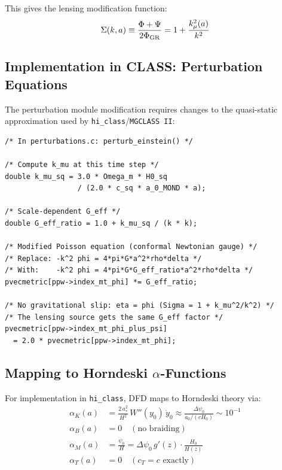 \documentclass[11pt,a4paper]{article}
\newcommand{\kmu}{k_\mu}
\newcommand{\hiclass}{\texttt{hi\_class}}
\newcommand{\MGCLASS}{\texttt{MGCLASS~II}}
\begin{document}
This gives the lensing modification function:
\begin{equation}
\Sigma(k,a) \equiv \frac{\Phi + \Psi}{2\Phi_{\rm GR}} = 1 + \frac{\kmu^2(a)}{k^2}
\end{equation}

\subsection{Implementation in CLASS: Perturbation Equations}

The perturbation module modification requires changes to the quasi-static
approximation used by \hiclass{}/\MGCLASS{}:

\begin{lstlisting}[caption={Pseudo-code for DFD perturbation module}]
/* In perturbations.c: perturb_einstein() */

/* Compute k_mu at this time step */
double k_mu_sq = 3.0 * Omega_m * H0_sq
                 / (2.0 * c_sq * a_0_MOND * a);

/* Scale-dependent G_eff */
double G_eff_ratio = 1.0 + k_mu_sq / (k * k);

/* Modified Poisson equation (conformal Newtonian gauge) */
/* Replace: -k^2 phi = 4*pi*G*a^2*rho*delta */
/* With:    -k^2 phi = 4*pi*G*G_eff_ratio*a^2*rho*delta */
pvecmetric[ppw->index_mt_phi] *= G_eff_ratio;

/* No gravitational slip: eta = phi (Sigma = 1 + k_mu^2/k^2) */
/* The lensing source gets the same G_eff factor */
pvecmetric[ppw->index_mt_phi_plus_psi]
  = 2.0 * pvecmetric[ppw->index_mt_phi];
\end{lstlisting}

\subsection{Mapping to Horndeski $\alpha$-Functions}

For implementation in \hiclass{}, DFD maps to Horndeski theory via:
\begin{equation}
\boxed{
\begin{aligned}
\alpha_K(a) &= \frac{2\,a_*^2}{H^2}\,W''(y_0)\,\dot{y}_0
\approx \frac{\Delta\psi_0}{a_0/(cH_0)} \sim 10^{-1} \\
\alpha_B(a) &= 0 \quad (\text{no braiding}) \\
\alpha_M(a) &= \frac{\dot{\psi}_0}{H} = \Delta\psi_0\,g'(z)
\cdot \frac{H_0}{H(z)} \\
\alpha_T(a) &= 0 \quad (c_T = c \text{ exactly})
\end{aligned}
}
\label{eq:horndeski_alphas}
\end{equation}
\end{document}
